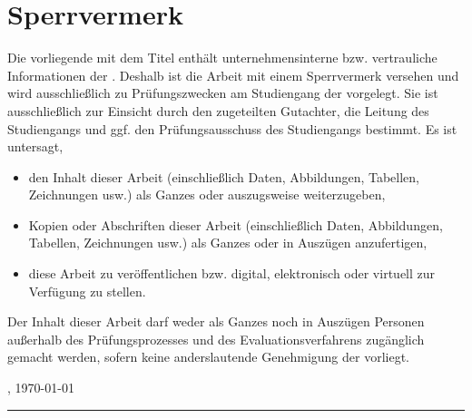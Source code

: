 \section*{Sperrvermerk}

Die vorliegende \art\/ mit dem Titel {\itshape{}\titel\/} enthält unternehmensinterne bzw. vertrauliche Informationen der \firma. Deshalb ist die Arbeit mit einem Sperrvermerk versehen und wird ausschließlich zu Prüfungszwecken am Studiengang \studienfach\/ der \hochschule\/ \campus\/ vorgelegt. Sie ist ausschließlich zur Einsicht durch den zugeteilten Gutachter, die Leitung des Studiengangs und ggf. den Prüfungsausschuss des Studiengangs bestimmt.  Es ist untersagt,
\begin{itemize}
  \item den Inhalt dieser Arbeit (einschließlich Daten, Abbildungen, Tabellen, Zeichnungen usw.) als Ganzes oder auszugsweise weiterzugeben,
  \item Kopien oder Abschriften dieser Arbeit (einschließlich Daten, Abbildungen, Tabellen, Zeichnungen usw.) als Ganzes oder in Auszügen anzufertigen,
  \item diese Arbeit zu veröffentlichen bzw. digital, elektronisch oder virtuell zur Verfügung zu stellen.
\end{itemize}
Der Inhalt dieser Arbeit darf weder als Ganzes noch in Auszügen Personen außerhalb des Prüfungsprozesses und des Evaluationsverfahrens zugänglich gemacht werden, sofern keine anderslautende Genehmigung der \firma vorliegt.

\vspace{3em}

\abgabeort, \today
\vspace{4em}

\rule{6cm}{0.4pt}\\
\autor